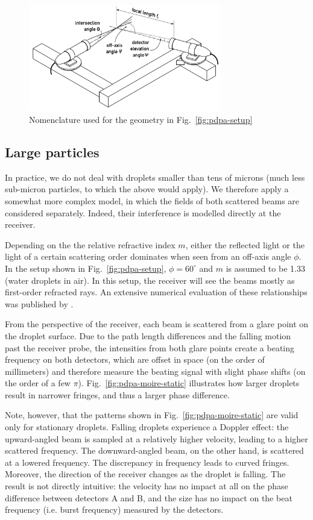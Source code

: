 \documentclass[11.5pt]{book}
\newcommand*{\figref}[1]{Fig.~\ref{#1}}
\begin{document}
\begin{figure}
    \centering
    \includegraphics[width=0.75\textwidth]{img/setup/pdpa_angles.pdf}
    \caption{Nomenclature used for the geometry in \figref{fig:pdpa-setup} \label{fig:pdpa-angles}}
\end{figure}

\subsection{Large particles}
In practice, we do not deal with droplets smaller than tens of microns (much
less sub-micron particles, to which the above would apply). We therefore apply a
somewhat more complex model, in which the fields of both scattered beams are
considered separately. Indeed, their interference is modelled directly at the
receiver.

Depending on the the relative refractive index $m$, either the reflected light
or the light of a certain scattering order dominates when seen from an off-axis
angle $\phi$. In the setup shown in \figref{fig:pdpa-setup}, $\phi = 60^\circ$
and $m$ is assumed to be 1.33 (water droplets in air). In this setup, the
receiver will see the beams mostly as first-order refracted rays. An extensive
numerical evaluation of these relationships was published by \citet{Naqwi96}.

From the perspective of the receiver, each beam is scattered from a glare point
on the droplet surface. Due to the path length differences and the falling
motion past the receiver probe, the intensities from both glare points create a
beating frequency on both detectors, which are offset in space (on the order of
millimeters) and therefore measure the beating signal with slight phase shifts
(on the order of a few $\pi$). \figref{fig:pdpa-moire-static} illustrates how larger
droplets result in narrower fringes, and thus a larger phase difference.

Note, however, that the patterns shown in \figref{fig:pdpa-moire-static} are
valid only for stationary droplets. Falling droplets experience a Doppler
effect: the upward-angled beam is sampled at a relatively higher velocity,
leading to a higher scattered frequency. The downward-angled beam, on the other
hand, is scattered at a lowered frequency. The discrepancy in frequency leads to
curved fringes. Moreover, the direction of the receiver changes as the droplet
is falling. The result is not directly intuitive: the velocity has no impact at
all on the phase difference between detectors A and B, and the size has no
impact on the beat frequency (i.e. burst frequency) measured by the detectors.
\end{document}
